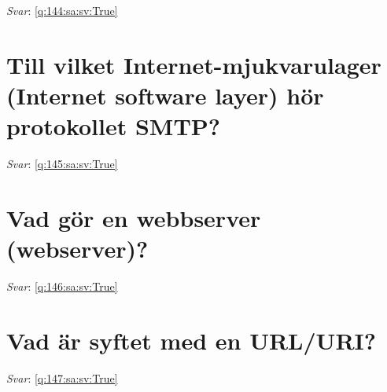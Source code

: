 \documentclass[a4paper,11pt,oneside]{book}
\begin{document}
\begin{sloppypar}
\label{q:144:sa:sv:False}

\vspace{2cm}

\noindent\makebox[\textwidth]{\hrulefill}

\vspace{1cm}

\textit{Svar}: \autoref{q:144:sa:sv:True}



\section{Till vilket Internet-mjukvarulager (Internet software layer) h\"or protokollet SMTP?}

\label{q:145:sa:sv:False}

\vspace{2cm}

\noindent\makebox[\textwidth]{\hrulefill}

\vspace{1cm}

\textit{Svar}: \autoref{q:145:sa:sv:True}



\section{Vad g\"or en webbserver (webserver)?}

\label{q:146:sa:sv:False}

\vspace{2cm}

\noindent\makebox[\textwidth]{\hrulefill}

\vspace{1cm}

\textit{Svar}: \autoref{q:146:sa:sv:True}



\section{Vad \"ar syftet med en URL/URI?}

\label{q:147:sa:sv:False}

\vspace{2cm}

\noindent\makebox[\textwidth]{\hrulefill}

\vspace{1cm}

\textit{Svar}: \autoref{q:147:sa:sv:True}




\end{sloppypar}
\end{document}
